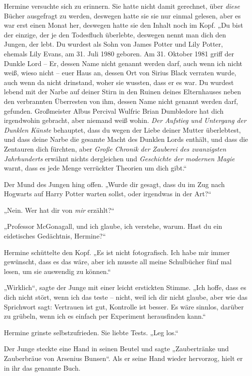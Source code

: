 Hermine versuchte sich zu erinnern. Sie hatte nicht damit gerechnet, über \emph{diese} Bücher ausgefragt zu werden, deswegen hatte sie sie nur einmal gelesen, aber es war erst einen Monat her, deswegen hatte sie den Inhalt noch im Kopf. „Du bist der einzige, der je den Todesfluch überlebte, deswegen nennt man dich den Jungen, der lebt. Du wurdest als Sohn von James Potter und Lily Potter, ehemals Lily Evans, am 31. Juli 1980 geboren. Am 31. Oktober 1981 griff der Dunkle Lord – Er, dessen Name nicht genannt werden darf, auch wenn ich nicht weiß, wieso nicht – euer Haus an, dessen Ort von Sirius Black verraten wurde, auch wenn da nicht drinstand, woher sie wussten, dass er es war. Du wurdest lebend mit der Narbe auf deiner Stirn in den Ruinen deines Elternhauses neben den verbrannten Überresten von ihm, dessen Name nicht genannt werden darf, gefunden. Großmeister Albus Percival Wulfric Brian Dumbledore hat dich irgendwohin gebracht, aber niemand weiß wohin. \emph{Der Aufstieg und Untergang der Dunklen Künste} behauptet, dass du wegen der Liebe deiner Mutter überlebtest, und dass deine Narbe die gesamte Macht des Dunklen Lords enthält, und dass die Zentauren dich fürchten, aber \emph{Große Chronik der Zauberei des zwanzigsten Jahrhunderts} erwähnt nichts dergleichen und \emph{Geschichte der modernen Magie} warnt, dass es jede Menge verrückter Theorien um dich gibt.“ 

Der Mund des Jungen hing offen. „Wurde dir gesagt, dass du im Zug nach Hogwarts auf Harry Potter warten sollst, oder irgendwas in der Art?“ 

„Nein. Wer hat dir von \emph{mir} erzählt?“ 

„Professor McGonagall, und ich glaube, ich verstehe, warum. Hast du ein eidetisches Gedächtnis, Hermine?“ 

Hermine schüttelte den Kopf. „Es ist nicht fotografisch. Ich habe mir immer gewünscht, dass es das wäre, aber ich musste all meine Schulbücher fünf mal lesen, um sie auswendig zu können.“ 

„Wirklich“, sagte der Junge mit einer leicht erstickten Stimme. „Ich hoffe, dass es dich nicht stört, wenn ich das teste – nicht, weil ich dir nicht glaube, aber wie das Sprichwort sagt: Vertrauen ist gut, Kontrolle ist besser. Es wäre sinnlos, darüber zu grübeln, wenn ich es einfach per Experiment herausfinden kann.“ 

Hermine grinste selbstzufrieden. Sie liebte Tests. „Leg los.“ 

Der Junge steckte eine Hand in seinen Beutel und sagte „Zaubertränke und Zauberbräue von Arsenius Bunsen“. Als er seine Hand wieder hervorzog, hielt er in ihr das genannte Buch. 

